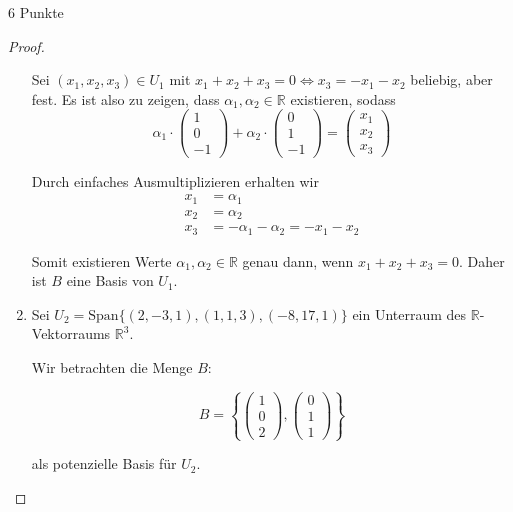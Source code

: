 \documentclass{../problemset}
\begin{document}
\begin{problem}{6 Punkte}
\begin{proof}
\begin{enumerate}
		      Sei $(x_1, x_2, x_3) \in U_1$ mit $x_1 + x_2 + x_3 = 0 \Leftrightarrow x_3 = - x_1 - x_2$ beliebig, aber fest. Es ist also zu zeigen, dass $\alpha_1, \alpha_2 \in \mathbb{R}$ existieren, sodass
		      \[
			      \alpha_1 \cdot \begin{pmatrix}
				      1 \\
				      0 \\
				      -1
			      \end{pmatrix} + \alpha_2 \cdot \begin{pmatrix}
				      0 \\
				      1 \\
				      -1
			      \end{pmatrix} = \begin{pmatrix}
				      x_1 \\
				      x_2 \\
				      x_3
			      \end{pmatrix}
		      \]

		      Durch einfaches Ausmultiplizieren erhalten wir
		      \begin{align*}
			      x_1 & = \alpha_1                                             \\
			      x_2 & = \alpha_2                                             \\
			      x_3 & = - \alpha_1 - \alpha_2 = - x_1 - x_2 \tag{\checkmark}
		      \end{align*}

		      Somit existieren Werte $\alpha_1, \alpha_2 \in \mathbb{R}$ genau dann, wenn $x_1 + x_2 + x_3 = 0$. Daher ist $B$ eine Basis von $U_1$.
		\item Sei $U_2 = \text{Span}\{(2, -3, 1), (1, 1, 3), (-8, 17, 1)\}$ ein Unterraum des $\mathbb{R}$-Vektorraums $\mathbb{R}^3$.

		      Wir betrachten die Menge $B$:

		      \[
			      B = \left\{
			      \begin{pmatrix}
				      1 \\ 0 \\ 2
			      \end{pmatrix},
			      \begin{pmatrix}
				      0 \\ 1 \\ 1
			      \end{pmatrix}
			      \right\}
		      \]

		      als potenzielle Basis für $U_2$.


\end{enumerate}
\end{proof}
\end{problem}
\end{document}
